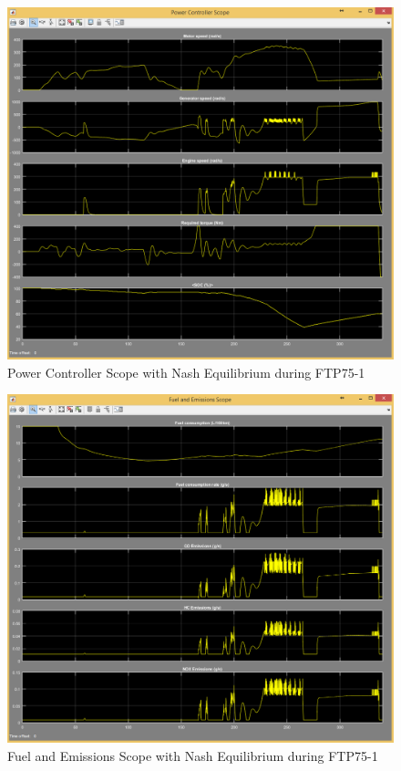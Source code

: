 \begin{figure}[h]
\centering
\includegraphics[scale=0.4]{figures/NashEquilibrium/FTP75-1/powerController13Juni}
\caption{Power Controller Scope with Nash Equilibrium during FTP75-1}
\label{fig:pcne1}
\end{figure}

\begin{figure}[h]
\centering
\includegraphics[scale=0.4]{figures/NashEquilibrium/FTP75-1/fuelEmissions13Juni}
\caption{Fuel and Emissions Scope with Nash Equilibrium during FTP75-1}
\label{fig:fene1}
\end{figure}

